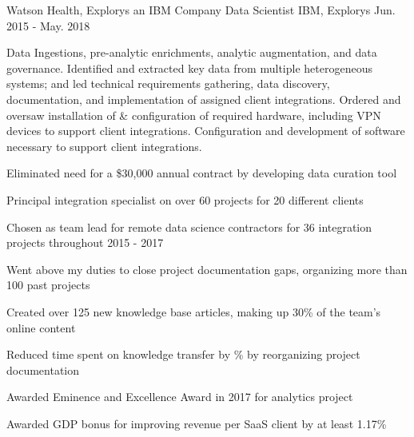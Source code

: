 \begin{cventries}
  \cventry
    {Watson Health, Explorys an IBM Company} %
    {Data Scientist} %
    {IBM, Explorys} %
    {Jun. 2015 - May. 2018} %
    {
      \begin{cvparagraph}
        Data Ingestions, pre-analytic enrichments, analytic augmentation, and data governance.  Identified and extracted key data from multiple heterogeneous systems; and led technical requirements gathering, data discovery, documentation, and implementation of assigned client integrations.  Ordered and oversaw installation of \& configuration of required hardware, including VPN devices to support client integrations.  Configuration and development of software necessary to support client integrations.
      \end{cvparagraph}
      \begin{cvitems} %
        \item {Eliminated need for a \$30,000 annual contract by developing data curation tool}
        \item {Principal integration specialist on over 60 projects for 20 different clients}
        \item {Chosen as team lead for  remote data science contractors for 36 integration projects throughout 2015 - 2017}
        \item {Went above my duties to close project documentation gaps, organizing more than 100 past projects}
        \item {Created over 125 new knowledge base articles, making up 30\% of the team's online content}
        \item {Reduced time spent on knowledge transfer by \% by reorganizing project documentation}
        \item {Awarded Eminence and Excellence Award in 2017 for analytics project}
        \item {Awarded GDP bonus for improving revenue per SaaS client by at least 1.17\%}
      \end{cvitems}
    }


\end{cventries}

